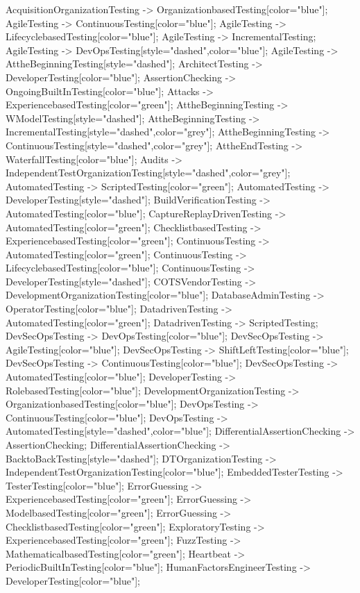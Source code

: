\documentclass{article}
\begin{document}
{AcquisitionOrganizationTesting -> OrganizationbasedTesting[color="blue"];
AgileTesting -> ContinuousTesting[color="blue"];
AgileTesting -> LifecyclebasedTesting[color="blue"];
AgileTesting -> IncrementalTesting;
AgileTesting -> DevOpsTesting[style="dashed",color="blue"];
AgileTesting -> AttheBeginningTesting[style="dashed"];
ArchitectTesting -> DeveloperTesting[color="blue"];
AssertionChecking -> OngoingBuiltInTesting[color="blue"];
Attacks -> ExperiencebasedTesting[color="green"];
AttheBeginningTesting -> WModelTesting[style="dashed"];
AttheBeginningTesting -> IncrementalTesting[style="dashed",color="grey"];
AttheBeginningTesting -> ContinuousTesting[style="dashed",color="grey"];
AttheEndTesting -> WaterfallTesting[color="blue"];
Audits -> IndependentTestOrganizationTesting[style="dashed",color="grey"];
AutomatedTesting -> ScriptedTesting[color="green"];
AutomatedTesting -> DeveloperTesting[style="dashed"];
BuildVerificationTesting -> AutomatedTesting[color="blue"];
CaptureReplayDrivenTesting -> AutomatedTesting[color="green"];
ChecklistbasedTesting -> ExperiencebasedTesting[color="green"];
ContinuousTesting -> AutomatedTesting[color="green"];
ContinuousTesting -> LifecyclebasedTesting[color="blue"];
ContinuousTesting -> DeveloperTesting[style="dashed"];
COTSVendorTesting -> DevelopmentOrganizationTesting[color="blue"];
DatabaseAdminTesting -> OperatorTesting[color="blue"];
DatadrivenTesting -> AutomatedTesting[color="green"];
DatadrivenTesting -> ScriptedTesting;
DevSecOpsTesting -> DevOpsTesting[color="blue"];
DevSecOpsTesting -> AgileTesting[color="blue"];
DevSecOpsTesting -> ShiftLeftTesting[color="blue"];
DevSecOpsTesting -> ContinuousTesting[color="blue"];
DevSecOpsTesting -> AutomatedTesting[color="blue"];
DeveloperTesting -> RolebasedTesting[color="blue"];
DevelopmentOrganizationTesting -> OrganizationbasedTesting[color="blue"];
DevOpsTesting -> ContinuousTesting[color="blue"];
DevOpsTesting -> AutomatedTesting[style="dashed",color="blue"];
DifferentialAssertionChecking -> AssertionChecking;
DifferentialAssertionChecking -> BacktoBackTesting[style="dashed"];
DTOrganizationTesting -> IndependentTestOrganizationTesting[color="blue"];
EmbeddedTesterTesting -> TesterTesting[color="blue"];
ErrorGuessing -> ExperiencebasedTesting[color="green"];
ErrorGuessing -> ModelbasedTesting[color="green"];
ErrorGuessing -> ChecklistbasedTesting[color="green"];
ExploratoryTesting -> ExperiencebasedTesting[color="green"];
FuzzTesting -> MathematicalbasedTesting[color="green"];
Heartbeat -> PeriodicBuiltInTesting[color="blue"];
HumanFactorsEngineerTesting -> DeveloperTesting[color="blue"];
}
\end{document}
